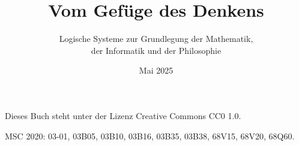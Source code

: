 \documentclass[paper=186mm:234mm,pagesize=auto,fleqn,11pt,dvipdfmx]{scrbook}
\title{Vom Gefüge des Denkens}
\subtitle{Logische Systeme zur Grundlegung der Mathematik,\\
der Informatik und der Philosophie}
\date{Mai 2025}
\theoremstyle{rmbox}
\numberwithin{Definition}{chapter}
\numberwithin{Satz}{chapter}
\begin{document}
\renewcommand{\figurename}{Abb.}
\renewcommand{\thepage}{C\arabic{page}}


\newpage
\thispagestyle{empty}
\mbox{}

\newpage
\addtocounter{page}{-2}
\renewcommand{\thepage}{\arabic{page}}
\thispagestyle{empty}

\maketitle


\noindent
Dieses Buch steht unter der Lizenz Creative Commons CC0 1.0.

\vspace{0.5cm}\noindent
{\footnotesize MSC 2020:
03-01, 03B05, 03B10, 03B16, 03B35, 03B38,
68V15, 68V20, 68Q60.}


\tableofcontents















\printindex
\end{document}
